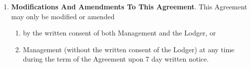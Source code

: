 \documentclass[12pt,letterpaper]{article}
\newcommand{\lodger}{Lodger}
\newcommand{\management}{Management}
\newcommand{\myemail}{Management Email}
\begin{document}
\begin{enumerate}
\begin{enumerate}
			\item \textbf{Notice To Management}. 
				Except as expressly provided elsewhere in this Agreement, all notices to \management{} shall be delivered via \management{}'s email address (the ``\myemail{}'') that is set forth in section \ref{specifics} of this Agreement{}.
		\end{enumerate}
	\item \textbf{Modifications And Amendments To This Agreement}. \label{modifications}
		This Agreement may only be modified or amended 
		\begin{enumerate}
			\item by the written consent of both \management{} and the \lodger{}, or 
			\item \management{} (without the written consent of the \lodger{}) at any time during the term of the Agreement upon 7 day written notice. 
		\end{enumerate}
				

\end{enumerate}
\end{document}
